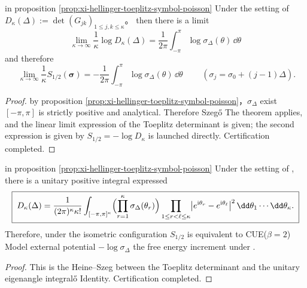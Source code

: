 \begin{theorem}\label{thm:xi-hellinger-toeplitz-szego-thermo-limit}
in proposition \ref{prop:xi-hellinger-toeplitz-symbol-poisson} Under the setting of
\(
D_\kappa(\Delta):=\det(G_{jk})_{1\le j,k\le\kappa}
\)。
then there is a limit
\[
\boxed{\;
\lim_{\kappa\to\infty}\frac{1}{\kappa}\log D_\kappa(\Delta)
=\frac{1}{2\pi}\int_{-\pi}^{\pi}\log\sigma_\Delta(\theta)\,\dd\theta\;}
\]
and therefore
\[
\boxed{\;
\lim_{\kappa\to\infty}\frac{1}{\kappa}S_{1/2}(\boldsymbol{\sigma})
=-\frac{1}{2\pi}\int_{-\pi}^{\pi}\log\sigma_\Delta(\theta)\,\dd\theta\;}
\qquad(\sigma_j=\sigma_0+(j-1)\Delta).
\]
\end{theorem}
\begin{proof}
by proposition \ref{prop:xi-hellinger-toeplitz-symbol-poisson}，\(\sigma_\Delta\) exist \([-\pi,\pi]\) is strictly positive and analytical.
Therefore Szeg\H{o} The theorem applies, and the linear limit expression of the Toeplitz determinant is given; the second expression is given by \(S_{1/2}=-\log D_\kappa\) is launched directly. Certification completed.
\end{proof}

\begin{proposition}\label{prop:xi-hellinger-toeplitz-heine-szego-cue}
in proposition \ref{prop:xi-hellinger-toeplitz-symbol-poisson} Under the setting of , there is a unitary positive integral expressed
\[
\boxed{\;
D_\kappa(\Delta)
=\frac{1}{(2\pi)^\kappa\kappa!}
\int_{[-\pi,\pi]^\kappa}
\Bigl(\prod_{r=1}^{\kappa}\sigma_\Delta(\theta_r)\Bigr)
\prod_{1\le r<\ell\le\kappa}\bigl|e^{\mathrm{i}\theta_r}-e^{\mathrm{i}\theta_\ell}\bigr|^2\,
\dd\theta_1\cdots\dd\theta_\kappa.\;}
\]
Therefore, under the isometric configuration \(S_{1/2}\) is equivalent to CUE(\(\beta=2\)) Model external potential \(-\log\sigma_\Delta\) the free energy increment under .
\end{proposition}
\begin{proof}
This is the Heine--Szeg between the Toeplitz determinant and the unitary eigenangle integral\H{o} Identity. Certification completed.
\end{proof}



